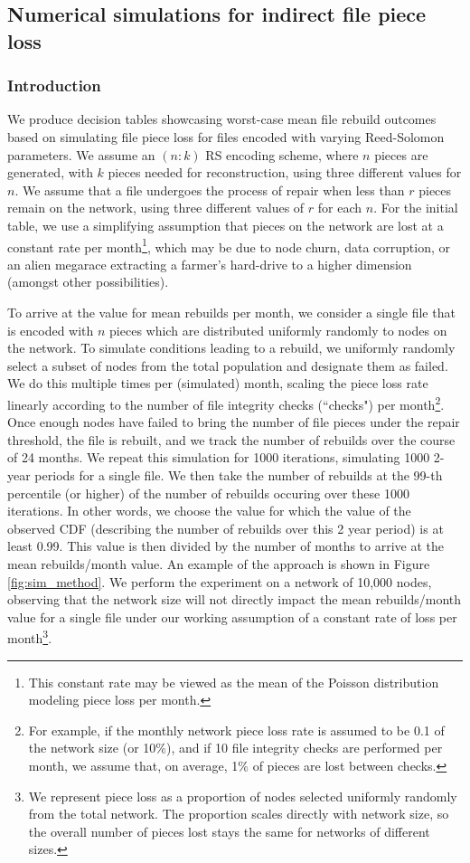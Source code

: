 
\subsection{Numerical simulations for indirect file piece loss}
\subsubsection{Introduction}
We produce decision tables showcasing worst-case mean file rebuild outcomes based on simulating file piece loss for files encoded with varying Reed-Solomon parameters. 
We assume an $(n:k)$ RS encoding scheme, where $n$ pieces are generated, with $k$ pieces needed for reconstruction, using three different values for $n$.
We assume that a file undergoes the process of repair when less than $r$ pieces remain on the network, using three different values of $r$ for each $n$.
For the initial table, we use a simplifying assumption that pieces on the network are lost at a constant rate per month\footnote{This constant rate may be viewed as the mean of the Poisson distribution modeling piece loss per month.}, which may be due to node churn, data corruption, or an alien megarace extracting a farmer's hard-drive to a higher dimension (amongst other possibilities).


To arrive at the value for mean rebuilds per month, we consider a single file that is encoded with $n$ pieces which are distributed uniformly randomly to nodes on the network. To simulate conditions leading to a rebuild, we uniformly randomly select a subset of nodes from the total population and designate them as failed. We do this multiple times per (simulated) month, scaling the piece loss rate linearly according to the number of file integrity checks (``checks") per month\footnote{
For example, if the monthly network piece loss rate is assumed to be 0.1 of the network size (or 10\%), and if 10 file integrity checks are performed per month, we assume that, on average, 1\% of pieces are lost between checks.}. 
Once enough nodes have failed to bring the number of file pieces under the repair threshold, the file is rebuilt, and we track the number of rebuilds over the course of 24 months.
We repeat this simulation for 1000 iterations, simulating 1000 2-year periods for a single file. We then take the number of rebuilds at the 99-th percentile (or higher) of the number of rebuilds occuring over these 1000 iterations. In other words, we choose the value for which the value of the observed CDF (describing the number of rebuilds over this 2 year period) is at least 0.99. This value is then divided by the number of months to arrive at the mean rebuilds/month value. An example of the approach is shown in Figure \ref{fig:sim_method}. We perform the experiment on a network of 10,000 nodes, observing that the network size will not directly impact the mean rebuilds/month value for a single file under our working assumption of a constant rate of loss per month\footnote{We represent piece loss as a proportion of nodes selected uniformly randomly from the total network. The proportion scales directly with network size, so the overall number of pieces lost stays the same for networks of different sizes.}.

